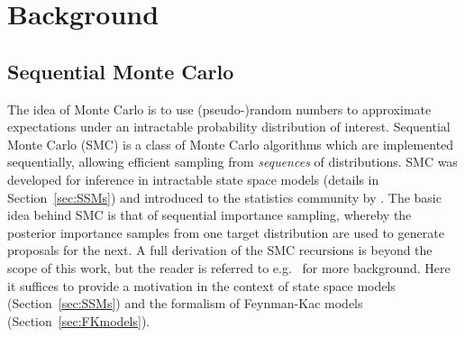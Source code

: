\chapter{Background}
\label{ch:bg}



\section{Sequential Monte Carlo}
The idea of Monte Carlo is to use (pseudo-)random numbers to approximate expectations under an intractable probability distribution of interest.
Sequential Monte Carlo (SMC) is a class of Monte Carlo algorithms which are implemented sequentially, allowing efficient sampling from \emph{sequences} of distributions.
SMC was developed for inference in intractable state space models (details in Section~\ref{sec:SSMs}) and introduced to the statistics community by \textcite{gordon1993}.
The basic idea behind SMC is that of sequential importance sampling, whereby the posterior importance samples from one target distribution are used to generate proposals for the next. A full derivation of the SMC recursions is beyond the scope of this work, but the reader is referred to e.g.\ \textcite{doucet2009, chopin2020} for more background. Here it suffices to provide a motivation in the context of state space models (Section~\ref{sec:SSMs}) and the formalism of Feynman-Kac models (Section~\ref{sec:FKmodels}).





